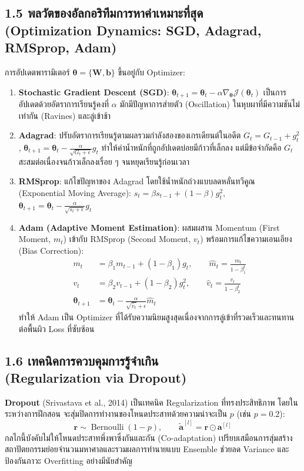 \documentclass[12pt,a4paper]{article}
\begin{document}
\subsection*{1.5 พลวัตของอัลกอริทึมการหาค่าเหมาะที่สุด\\ \normalsize(Optimization Dynamics: SGD, Adagrad, RMSprop, Adam)}
การอัปเดตพารามิเตอร์ $\bm{\theta} = \{\mathbf{W}, \mathbf{b}\}$ ขึ้นอยู่กับ Optimizer:
\begin{enumerate}[leftmargin=18pt, itemsep=3pt]
    \item \textbf{Stochastic Gradient Descent (SGD)}:
    $\bm{\theta}_{t+1} = \bm{\theta}_t - \alpha \nabla_{\bm{\theta}} \mathcal{J}(\bm{\theta}_t)$
    เป็นการอัปเดตด้วยอัตราการเรียนรู้คงที่ $\alpha$ มักมีปัญหาการส่ายตัว (Oscillation) ในหุบผาที่มีความชันไม่เท่ากัน (Ravines) และลู่เข้าช้า
    \item \textbf{Adagrad}: ปรับอัตราการเรียนรู้ตามผลรวมกำลังสองของเกรเดียนต์ในอดีต $G_t = G_{t-1} + g_t^2$, $\bm{\theta}_{t+1} = \bm{\theta}_t - \frac{\alpha}{\sqrt{G_t + \epsilon}} g_t$ ทำให้ค่าน้ำหนักที่ถูกอัปเดตบ่อยมีก้าวที่เล็กลง แต่มีข้อจำกัดคือ $G_t$ สะสมต่อเนื่องจนก้าวเล็กลงเรื่อย ๆ จนหยุดเรียนรู้ก่อนเวลา
    \item \textbf{RMSprop}: แก้ไขปัญหาของ Adagrad โดยใช้น้ำหนักถ่วงแบบลดหลั่นทวีคูณ (Exponential Moving Average):
    $s_t = \beta s_{t-1} + (1-\beta) g_t^2$, $\bm{\theta}_{t+1} = \bm{\theta}_t - \frac{\alpha}{\sqrt{s_t + \epsilon}} g_t$
    \item \textbf{Adam (Adaptive Moment Estimation)}: ผสมผสาน Momentum (First Moment, $m_t$) เข้ากับ RMSprop (Second Moment, $v_t$) พร้อมการแก้ไขความเอนเอียง (Bias Correction):
    \begin{align}
    m_t &= \beta_1 m_{t-1} + (1-\beta_1) g_t, \qquad \hat{m}_t = \frac{m_t}{1 - \beta_1^t} \\
    v_t &= \beta_2 v_{t-1} + (1-\beta_2) g_t^2, \qquad \hat{v}_t = \frac{v_t}{1 - \beta_2^t} \\
    \bm{\theta}_{t+1} &= \bm{\theta}_t - \frac{\alpha}{\sqrt{\hat{v}_t} + \epsilon} \hat{m}_t
    \end{align}
    ทำให้ Adam เป็น Optimizer ที่ได้รับความนิยมสูงสุดเนื่องจากการลู่เข้าที่รวดเร็วและทนทานต่อพื้นผิว Loss ที่ซับซ้อน
\end{enumerate}

\subsection*{1.6 เทคนิคการควบคุมการรู้จำเกิน\\ \normalsize(Regularization via Dropout)}
\textbf{Dropout} (Srivastava et al., 2014) เป็นเทคนิค Regularization ที่ทรงประสิทธิภาพ โดยในระหว่างการฝึกสอน จะสุ่มปิดการทำงานของโหนดประสาทด้วยความน่าจะเป็น $p$ (เช่น $p=0.2$):
\begin{equation}
\mathbf{r} \sim \operatorname{Bernoulli}(1-p), \qquad \tilde{\mathbf{a}}^{[l]} = \mathbf{r} \odot \mathbf{a}^{[l]}
\end{equation}
กลไกนี้บังคับไม่ให้โหนดประสาทพึ่งพาซึ่งกันและกัน (Co-adaptation) เปรียบเสมือนการสุ่มสร้างสถาปัตยกรรมย่อยจำนวนมหาศาลและรวมผลการทำนายแบบ Ensemble ช่วยลด Variance และป้องกันภาวะ Overfitting อย่างมีนัยสำคัญ
\end{document}
